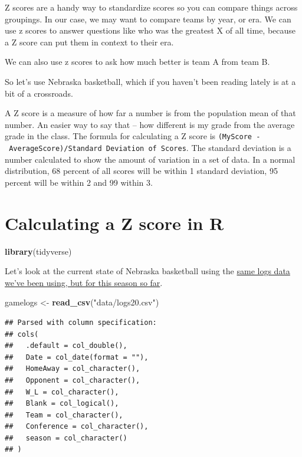 \documentclass[]{book}
\newenvironment{Shaded}{\begin{snugshade}}{\end{snugshade}}
\newcommand{\KeywordTok}[1]{\textcolor[rgb]{0.13,0.29,0.53}{\textbf{#1}}}
\newcommand{\NormalTok}[1]{#1}
\newcommand{\StringTok}[1]{\textcolor[rgb]{0.31,0.60,0.02}{#1}}
\begin{document}
Z scores are a handy way to standardize scores so you can compare things across groupings. In our case, we may want to compare teams by year, or era. We can use z scores to answer questions like who was the greatest X of all time, because a Z score can put them in context to their era.

We can also use z scores to ask how much better is team A from team B.

So let's use Nebraska basketball, which if you haven't been reading lately is at a bit of a crossroads.

A Z score is a measure of how far a number is from the population mean of that number. An easier way to say that -- how different is my grade from the average grade in the class. The formula for calculating a Z score is \texttt{(MyScore\ -\ AverageScore)/Standard\ Deviation\ of\ Scores}. The standard deviation is a number calculated to show the amount of variation in a set of data. In a normal distribution, 68 percent of all scores will be within 1 standard deviation, 95 percent will be within 2 and 99 within 3.

\hypertarget{calculating-a-z-score-in-r}{%
\section{Calculating a Z score in R}\label{calculating-a-z-score-in-r}}

\begin{Shaded}
\begin{Highlighting}[]
\KeywordTok{library}\NormalTok{(tidyverse)}
\end{Highlighting}
\end{Shaded}

Let's look at the current state of Nebraska basketball using the \href{https://unl.box.com/s/wnlh0u9low1yh56enion8zjmu8r7dc8p}{same logs data we've been using, but for this season so far}.

\begin{Shaded}
\begin{Highlighting}[]
\NormalTok{gamelogs <-}\StringTok{ }\KeywordTok{read_csv}\NormalTok{(}\StringTok{"data/logs20.csv"}\NormalTok{)}
\end{Highlighting}
\end{Shaded}

\begin{verbatim}
## Parsed with column specification:
## cols(
##   .default = col_double(),
##   Date = col_date(format = ""),
##   HomeAway = col_character(),
##   Opponent = col_character(),
##   W_L = col_character(),
##   Blank = col_logical(),
##   Team = col_character(),
##   Conference = col_character(),
##   season = col_character()
## )
\end{verbatim}
\end{document}
